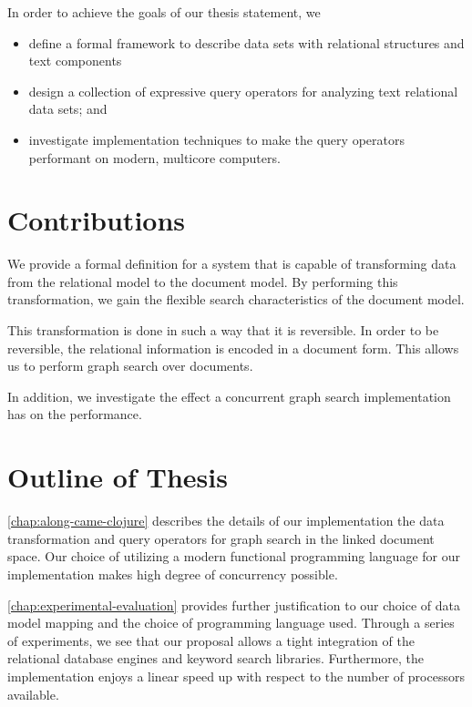 		In order to achieve the goals of our thesis statement, we
		
		\begin{itemize}
			\item define a formal framework to describe data sets with relational structures and text components
			\item design a collection of expressive query operators for analyzing text relational data sets; and
			\item investigate implementation techniques to make the query operators performant on modern, multicore computers.
		\end{itemize}
		
	 \section{Contributions}
	 	We provide a formal definition for a system that is capable of transforming data from the relational model to the document model.  By performing this transformation, we gain the flexible search characteristics of the document model.
	 	
	 	This transformation is done in such a way that it is reversible.  In order to be reversible, the relational information is encoded in a document form.  This allows us to perform graph search over documents.
	 	
	 	In addition, we investigate the effect a concurrent graph search implementation has on the performance.




	
	\section{Outline of Thesis}
		\cref{chap:along-came-clojure} describes the details of our implementation the data transformation and query operators for graph search in the linked document space.  Our choice of utilizing a modern functional programming language for our implementation makes high degree of concurrency possible.
		
		\cref{chap:experimental-evaluation} provides further justification to our choice of data model mapping and the choice of programming language used.  Through a series of experiments, we see that our proposal allows a tight integration of the relational database engines and keyword search libraries.  Furthermore, the implementation enjoys a linear speed up with respect to the number of processors available.